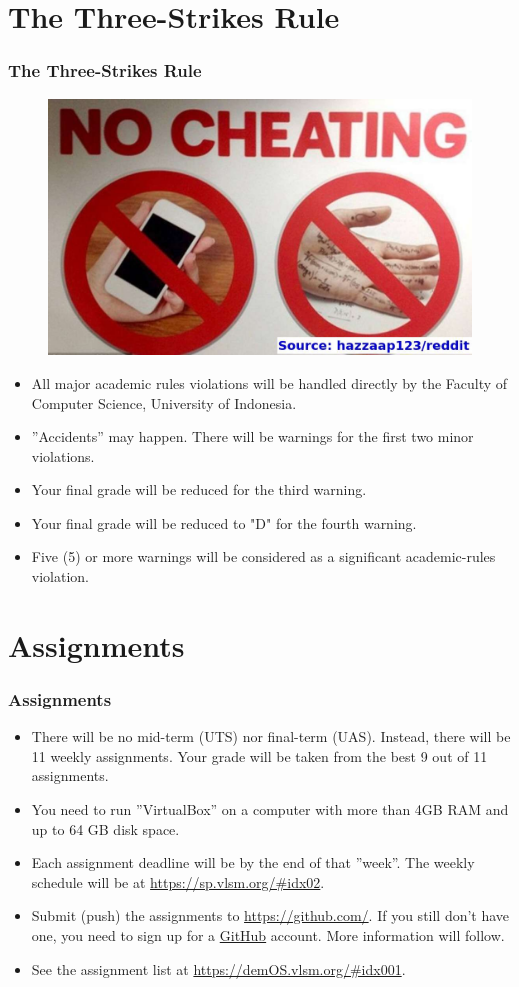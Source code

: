 \documentclass[aspectratio=169, xcolor=table, notheorems, hyperref={pdfpagelabels=false}]{beamer}
\begin{document}
\section{The Three-Strikes Rule}
\begin{frame}[fragile]
\frametitle{The Three-Strikes Rule}

\begin{figure}
\includegraphics[width=0.30\linewidth]{os-cheating}
\end{figure}

\begin{itemize}
\item All major academic rules violations will be handled directly by the Faculty of Computer Science,
University of Indonesia.
\item ''Accidents'' may happen. There will be warnings for the first two minor violations.
\item Your final grade will be reduced for the third warning.
\item Your final grade will be reduced to "D" for the fourth warning.
\item Five (5) or more warnings will be considered as a significant academic-rules violation.
\end{itemize}

\end{frame}

\section{Assignments}
\begin{frame}[fragile]
\frametitle{Assignments}
\begin{itemize}
\item There will be no mid-term (UTS) nor final-term (UAS).
      Instead, there will be 11 weekly assignments.
      Your grade will be taken from the best 9 out of 11 assignments.
\item You need to run ''VirtualBox'' on a computer with more than 4GB RAM and up to 64 GB disk space.
\item Each assignment deadline will be by the end of that ''week''.
      The weekly schedule will be at \url{https://sp.vlsm.org/\#idx02}.
\item Submit (push) the assignments to \url{https://github.com/}.
      If you still don't have one, you need to sign up for a \href{https://github.com/}{GitHub} account.
      More information will follow.
\item See the assignment list at \url{https://demOS.vlsm.org/#idx001}.
\end{itemize}
\end{frame}
\end{document}
